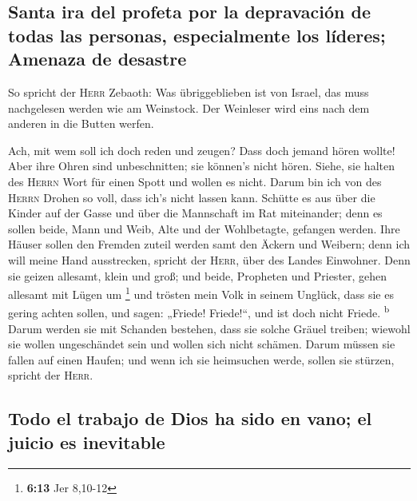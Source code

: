 \hypertarget{santa-ira-del-profeta-por-la-depravaciuxf3n-de-todas-las-personas-especialmente-los-luxedderes-amenaza-de-desastre}{%
\subsection{Santa ira del profeta por la depravación de todas las
personas, especialmente los líderes; Amenaza de
desastre}\label{santa-ira-del-profeta-por-la-depravaciuxf3n-de-todas-las-personas-especialmente-los-luxedderes-amenaza-de-desastre}}

 So spricht der \textsc{Herr} Zebaoth: Was übriggeblieben
ist von Israel, das muss nachgelesen werden wie am Weinstock. Der
Weinleser wird eins nach dem anderen in die Butten werfen.

 Ach, mit wem soll ich doch reden und zeugen? Dass doch
jemand hören wollte! Aber ihre Ohren sind unbeschnitten; sie können's
nicht hören. Siehe, sie halten des \textsc{Herrn} Wort für einen Spott
und wollen es nicht.  Darum bin ich von des
\textsc{Herrn} Drohen so voll, dass ich's nicht lassen kann. Schütte es
aus über die Kinder auf der Gasse und über die Mannschaft im Rat
miteinander; denn es sollen beide, Mann und Weib, Alte und der
Wohlbetagte, gefangen werden.  Ihre Häuser sollen den
Fremden zuteil werden samt den Äckern und Weibern; denn ich will meine
Hand ausstrecken, spricht der \textsc{Herr}, über des Landes Einwohner.
 Denn sie geizen allesamt, klein und groß; und beide,
Propheten und Priester, gehen allesamt mit Lügen um \footnote{\textbf{6:13}
  Jer 8,10-12}  und trösten mein Volk in seinem Unglück,
dass sie es gering achten sollen, und sagen: „Friede! Friede!{}``, und
ist doch nicht Friede. \textsuperscript{b}  Darum werden
sie mit Schanden bestehen, dass sie solche Gräuel treiben; wiewohl sie
wollen ungeschändet sein und wollen sich nicht schämen. Darum müssen sie
fallen auf einen Haufen; und wenn ich sie heimsuchen werde, sollen sie
stürzen, spricht der \textsc{Herr}.

\hypertarget{todo-el-trabajo-de-dios-ha-sido-en-vano-el-juicio-es-inevitable}{%
\subsection{Todo el trabajo de Dios ha sido en vano; el juicio es
inevitable}\label{todo-el-trabajo-de-dios-ha-sido-en-vano-el-juicio-es-inevitable}}

